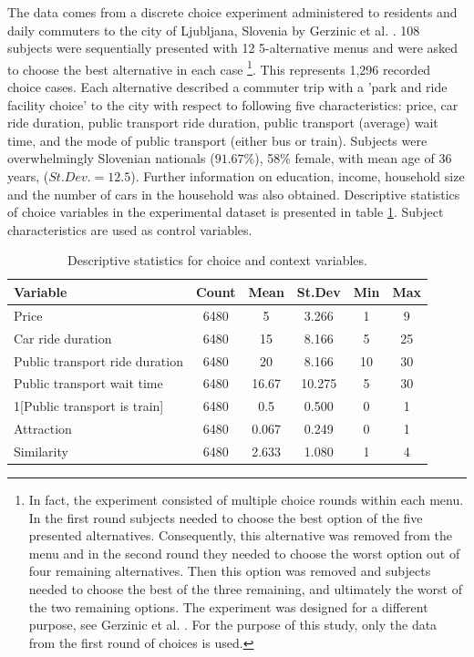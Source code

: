 \documentclass[a4paper,12pt]{article}
\newcommand{\citeyearonly}[1]{\citeyearpar{#1}}
\begin{document}
The data comes from a discrete choice experiment administered to residents and daily commuters to the city of Ljubljana, Slovenia by Gerzinic et al. \citeyearonly{gerzinicEtAl21}. 108 subjects were sequentially presented with 12 5-alternative menus and were asked to choose the best alternative in each case \footnote{In fact, the experiment consisted of multiple choice rounds within each menu. In the first round subjects needed to choose the best option of the five presented alternatives. Consequently, this alternative was removed from the menu and in the second round they needed to choose the worst option out of four remaining alternatives. Then this option was removed and subjects needed to choose the best of the three remaining, and ultimately the worst of the two remaining options. The experiment was designed for a different purpose, see Gerzinic et al. \citeyearonly{gerzinicEtAl21}. For the purpose of this study, only the data from the first round of choices is used.}.  This represents 1,296 recorded choice cases. Each alternative described a commuter trip with a 'park and ride facility choice' to the city with respect to following five characteristics: price, car ride duration, public transport ride duration, public transport (average) wait time, and the mode of public transport (either bus or train). Subjects were overwhelmingly Slovenian nationals ($91.67\%$), 58\% female, with mean age of 36 years, ($St. Dev.=12.5$). Further information on education, income, household size and the number of cars in the household was also obtained. Descriptive  statistics of choice variables in the experimental dataset is presented in table \ref{tab:descriptivesNejc}. Subject characteristics are used as control variables.

\begin{table}[ht]
    \centering
    \begin{tabular}{lccccc}
    \toprule
    Variable & Count & Mean & St.Dev & Min & Max \\
    \midrule
    Price & 6480 & 5 & 3.266 & 1 & 9 \\
    Car ride duration & 6480 & 15 & 8.166 & 5 & 25 \\
    Public transport ride duration & 6480 & 20 & 8.166 & 10 & 30 \\
    Public transport wait time & 6480 & 16.67 & 10.275 & 5 & 30 \\
    1[Public transport is train] & 6480 & 0.5 & 0.500 & 0 & 1 \\
    Attraction & 6480 & 0.067 & 0.249 & 0 & 1 \\
    Similarity & 6480 & 2.633 & 1.080 & 1 & 4 \\
    \bottomrule
    \end{tabular}
    \caption{Descriptive statistics for choice and context variables.}
    \label{tab:descriptivesNejc}
\end{table}
\end{document}
